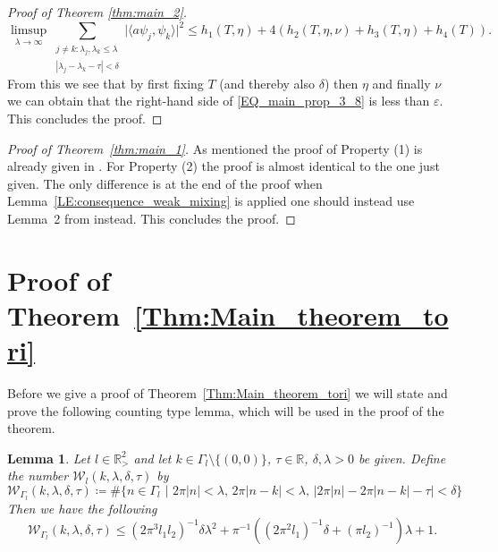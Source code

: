 \documentclass[11pt,twoside,reqno]{amsart}
\newcommand{\R}{\mathbb{R}}
\newcommand{\1}{\mathrm{\mathbf{1}}}
\numberwithin{equation}{section}
\theoremstyle{plain}
\newtheorem{lemma}[thm]{Lemma}
\theoremstyle{definition}
\theoremstyle{remark}
\begin{document}
\begin{proof}[Proof of Theorem \ref{thm:main_2}]
\begin{equation}\label{EQ_main_prop_3_8}
    \limsup_{\lambda\rightarrow\infty}  \sum_{\substack{j\neq k: \lambda_j,\lambda_k\leq \lambda  \\ |\lambda_{j}-\lambda_{k}-\tau| < \delta}} \big| \langle a \psi_j , \psi_k\rangle  \big|^2 
    \leq h_1(T,\eta) + 4( h_{2}(T,\eta,\nu) +  h_3(T,\eta) +  h_4(T)).
\end{equation}
From this we see that by first fixing $T$ (and thereby also $\delta$) then $\eta$ and finally $\nu$ we can obtain that the right-hand side of \eqref{EQ_main_prop_3_8} is less than $\varepsilon$. This concludes the proof.
\end{proof}

\begin{proof}[Proof of Theorem~\ref{thm:main_1}]
    As mentioned the proof of Property (1) is already given in \cite{MR2879311}. For Property (2) the proof is almost identical to the one just given. The only difference is at the end of the proof when Lemma~\ref{LE:consequence_weak_mixing} is applied one should instead use Lemma~{2} from \cite{MR2879311} instead. This concludes the proof.
\end{proof}

    
\section{Proof of Theorem~\ref{Thm:Main_theorem_tori}}

Before we give a proof of Theorem~\ref{Thm:Main_theorem_tori} we will state and prove the following counting type lemma, which will be used in the proof of the theorem.

\begin{lemma}\label{LE:simple_counting_lemma}
    Let $l\in\R_{>}^2$ and let $k \in \Gamma_l \setminus\{(0,0)\}$, $\tau\in \R$, $\delta,\lambda>0$ be given. Define the number $\mathcal{W}_{l}(k,\lambda,\delta,\tau)$ by
    \begin{equation*}
        \mathcal{W}_{\Gamma_l}(k,\lambda,\delta,\tau) \coloneqq \# \big\{ n\in \Gamma_l \,\, | \, \, 2\pi|n| <\lambda, \, 2\pi|n-k| <\lambda, \, |2\pi|n| -2\pi|n-k| - \tau|<\delta   \big\}
    \end{equation*}
 Then we have the following
    \begin{equation*}
        \mathcal{W}_{\Gamma_l}(k,\lambda,\delta,\tau) \leq (2\pi^3 l_1l_2)^{-1}\delta\lambda^2 +\pi^{-1}((2\pi^2 l_1)^{-1}\delta +(\pi l_2)^{-1})\lambda +1.
    \end{equation*}
\end{lemma}
\end{document}
